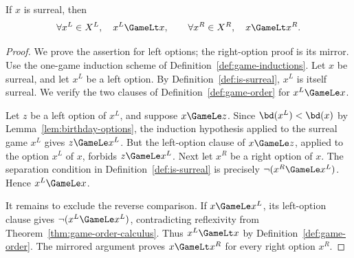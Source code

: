 \begin{theorem}
  \label{thm:between-options}
  \leanok
  If \(x\) is surreal, then
  \[
    \forall x^L\in X^L,\quad x^L\GameLt x,
    \qquad
    \forall x^R\in X^R,\quad x\GameLt x^R.
  \]
\end{theorem}
\begin{proof}
  \leanok
  We prove the assertion for left options; the right-option proof is its
  mirror.  Use the one-game induction scheme of
  Definition~\ref{def:game-inductions}.  Let \(x\) be surreal, and let
  \(x^L\) be a left option.  By Definition~\ref{def:is-surreal}, \(x^L\) is
  itself surreal.  We verify the two clauses of
  Definition~\ref{def:game-order} for \(x^L\GameLe x\).

  Let \(z\) be a left option of \(x^L\), and suppose \(x\GameLe z\).  Since
  \(\bd(x^L)<\bd(x)\) by Lemma~\ref{lem:birthday-options}, the induction
  hypothesis applied to the surreal game \(x^L\) gives \(z\GameLe x^L\).
  But the left-option clause of \(x\GameLe z\), applied to the option \(x^L\)
  of \(x\), forbids \(z\GameLe x^L\).  Next let \(x^R\) be a right option of
  \(x\).  The separation condition in Definition~\ref{def:is-surreal} is
  precisely \(\neg(x^R\GameLe x^L)\).  Hence \(x^L\GameLe x\).

  It remains to exclude the reverse comparison.  If \(x\GameLe x^L\), its
  left-option clause gives \(\neg(x^L\GameLe x^L)\), contradicting
  reflexivity from Theorem~\ref{thm:game-order-calculus}.  Thus
  \(x^L\GameLt x\) by Definition~\ref{def:game-order}.  The mirrored argument
  proves \(x\GameLt x^R\) for every right option \(x^R\).
\end{proof}

